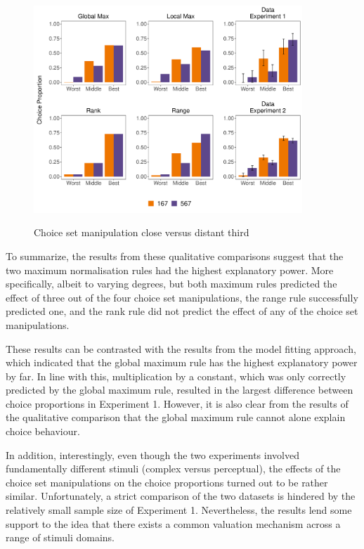 \documentclass[11pt,a4paper]{article}
\begin{document}
\begin{figure}[!htb]
\captionsetup{justification=centering}
\centering
\caption{Choice set manipulation close versus distant third}
\includegraphics[width=0.9\textwidth]{./closedistthird.pdf}
\label{fig:closedist3rd_all}
\end{figure}


To summarize, the results from these qualitative comparisons suggest that the two maximum normalisation rules had the highest explanatory power. More specifically, albeit to varying degrees, but both maximum rules predicted the effect of three out of the four choice set manipulations, the range rule successfully predicted one, and the rank rule did not predict the effect of any of the choice set manipulations.

These results can be contrasted with the results from the model fitting approach, which indicated that the global maximum rule has the highest explanatory power by far. In line with this, multiplication by a constant, which was only correctly predicted by the global maximum rule, resulted in the largest difference between choice proportions in Experiment 1. However, it is also clear from the results of the qualitative comparison that the global maximum rule cannot alone explain choice behaviour.


In addition, interestingly, even though the two experiments involved fundamentally different stimuli (complex versus perceptual), the effects of the choice set manipulations on the choice proportions turned out to be rather similar. Unfortunately, a strict comparison of the two datasets is hindered by the relatively small sample size of Experiment 1. Nevertheless, the results lend some support to the idea that there exists a common valuation mechanism across a range of stimuli domains.
\end{document}
